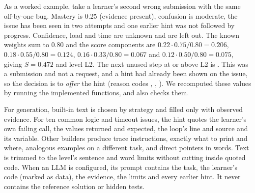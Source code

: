 As a worked example, take a learner's second wrong submission with the same off-by-one bug. Mastery is 0.25 (evidence present), confusion is moderate, the issue has been seen in two attempts and one earlier hint was not followed by progress. Confidence, load and time are unknown and are left out. The known weights sum to 0.80 and the score components are $0.22\cdot0.75/0.80=0.206$, $0.18\cdot0.55/0.80=0.124$, $0.16\cdot0.33/0.80=0.067$ and $0.12\cdot0.50/0.80=0.075$, giving $S=0.472$ and level L2. The next unused step at or above L2 is . This was a submission and not a request, and a hint had already been shown on the issue, so the decision is to \emph{offer} the hint (reason codes , , ). We recomputed these values by running the implemented functions, and  also checks them.

For generation, built-in text is chosen by strategy and filled only with observed evidence. For ten common logic and timeout issues, the hint quotes the learner's own failing call, the values returned and expected, the loop's line and source and its variable. Other builders produce trace instructions, exactly what to print and where, analogous examples on a different task, and direct pointers in words. Text is trimmed to the level's sentence and word limits without cutting inside quoted code. When an LLM is configured, its prompt contains the task, the learner's code (marked as data), the evidence, the limits and every earlier hint. It never contains the reference solution or hidden tests.

